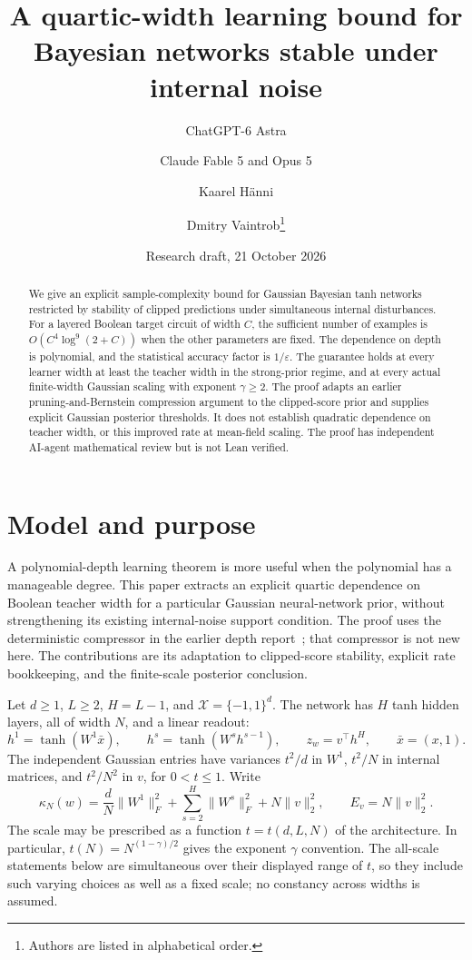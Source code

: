 \documentclass[11pt]{article}
\author{ChatGPT-6 Astra \and Claude Fable 5 and Opus 5 \and Kaarel H\"anni \and Dmitry Vaintrob\thanks{Authors are listed in alphabetical order.}}
\date{Research draft, 21 October 2026}
\title{A quartic-width learning bound for Bayesian networks stable under internal noise}
\begin{document}
\maketitle
\begin{abstract}
We give an explicit sample-complexity bound for Gaussian Bayesian tanh
networks restricted by stability of clipped predictions under simultaneous
internal disturbances. For a layered Boolean target circuit of width $C$,
the sufficient number of examples is $O(C^4\log^9(2+C))$ when the other
parameters are fixed. The dependence on depth is polynomial, and the
statistical accuracy factor is $1/\varepsilon$. The guarantee holds at every
learner width at least the teacher width in the strong-prior regime, and at
every actual finite-width Gaussian scaling with exponent $\gamma\ge2$.
The proof adapts an earlier pruning-and-Bernstein compression argument to
the clipped-score prior and supplies explicit Gaussian posterior thresholds.
It does not establish quadratic dependence on teacher width, or this
improved rate at mean-field scaling. The proof has independent AI-agent
mathematical review but is not Lean verified.
\end{abstract}

\section{Model and purpose}
A polynomial-depth learning theorem is more useful when the polynomial has
a manageable degree. This paper extracts an explicit quartic dependence on
Boolean teacher width for a particular Gaussian neural-network prior,
without strengthening its existing internal-noise support condition.
The proof uses the deterministic compressor in the earlier depth
report~\cite{depth-report}; that compressor is not new here. The contributions
are its adaptation to clipped-score stability, explicit rate bookkeeping,
and the finite-scale posterior conclusion.

Let $d\ge1$, $L\ge2$, $H=L-1$, and $\mathcal X=\{-1,1\}^d$.
The network has $H$ tanh hidden layers, all of width $N$, and a linear
readout:
\[
 h^1=\tanh(W^1\bar x),\qquad h^s=\tanh(W^sh^{s-1}),\qquad
 z_w=v^\top h^H,\qquad \bar x=(x,1).
\]
The independent Gaussian entries have variances $t^2/d$ in $W^1$,
$t^2/N$ in internal matrices, and $t^2/N^2$ in $v$, for $0<t\le1$.
Write
\[
 \kappa_N(w)=\frac dN\|W^1\|_F^2+
 \sum_{s=2}^H\|W^s\|_F^2+N\|v\|_2^2,
 \qquad E_v=N\|v\|_2^2.
\]
The scale may be prescribed as a function $t=t(d,L,N)$ of the
architecture. In particular, $t(N)=N^{(1-\gamma)/2}$ gives the exponent
$\gamma$ convention. The all-scale statements below are simultaneous
over their displayed range of $t$, so they include such varying choices
as well as a fixed scale; no constancy across widths is assumed.
\end{document}
